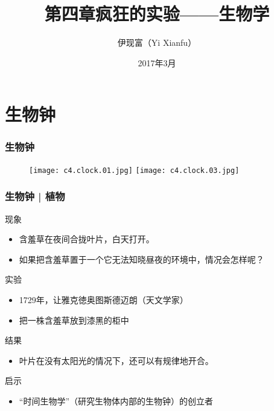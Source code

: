 



\title[生物学]{第四章\quad 疯狂的实验——生物学}
\author[Yixf]{伊现富（Yi Xianfu）}
\date{2017年3月}



\section{生物钟}
\begin{frame}
  \frametitle{生物钟}
  \begin{figure}
    \centering
    \texttt{[image: c4.clock.01.jpg]}
    \texttt{[image: c4.clock.03.jpg]}
  \end{figure}
\end{frame}

\begin{frame}
  \frametitle{生物钟 | 植物}
  \begin{block}{现象}
    \begin{itemize}
      \item 含羞草在夜间合拢叶片，白天打开。
      \item 如果把含羞草置于一个它无法知晓昼夜的环境中，情况会怎样呢？
    \end{itemize}
  \end{block}
  \pause
  \begin{block}{实验}
    \begin{itemize}
      \item 1729年，让\textbullet 雅克\textbullet 徳奥图斯\textbullet 德迈朗（天文学家）
      \item 把一株含羞草放到漆黑的柜中
    \end{itemize}
  \end{block}
  \pause
  \begin{block}{结果}
    \begin{itemize}
      \item 叶片在没有太阳光的情况下，还可以有规律地开合。
    \end{itemize}
  \end{block}
  \pause
  \begin{block}{启示}
    \begin{itemize}
      \item “时间生物学”（研究生物体内部的生物钟）的创立者
    \end{itemize}
  \end{block}
\end{frame}

